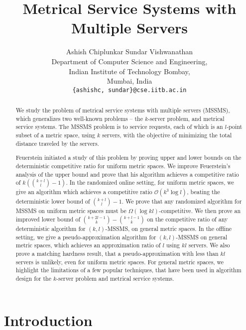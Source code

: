 \documentclass[11pt]{article}
\theoremstyle{plain}\newtheorem{theorem}{Theorem}
\theoremstyle{definition}
\theoremstyle{remark}
\begin{document}
\title{Metrical Service Systems with Multiple Servers}
\author{Ashish Chiplunkar \qquad Sundar Vishwanathan\\
Department of Computer Science and Engineering,\\
Indian Institute of Technology Bombay,\\
Mumbai, India\\
\texttt{\{ashishc, sundar\}@cse.iitb.ac.in}
}
\date{}
\maketitle

\begin{abstract}
We study the problem of metrical service systems with multiple servers (MSSMS), which generalizes two well-known problems -- the $k$-server problem, and metrical service systems. 
The MSSMS problem is to service requests, each of which is an $l$-point subset of a metric space, using $k$ servers, with the objective of minimizing the total distance traveled by the servers.


Feuerstein \cite{Feuerstein98} initiated a study of this problem by proving upper and lower bounds on the deterministic competitive ratio for uniform metric spaces. We improve Feuerstein's analysis of the upper bound and prove that his algorithm achieves a competitive ratio of $k\left({{k+l}\choose{l}}-1\right)$.
In the randomized online setting, for uniform metric spaces, we give an algorithm which achieves a competitive ratio $\mathcal{O}(k^3\log l)$, beating the deterministic lower bound of ${{k+l}\choose{l}}-1$.
We prove that any randomized algorithm for MSSMS on uniform metric spaces must be $\Omega(\log kl)$-competitive. We then prove an improved lower bound of ${{k+2l-1}\choose{k}}-{{k+l-1}\choose{k}}$ on the competitive ratio of any deterministic algorithm for $(k,l)$-MSSMS, on general metric spaces. In the offline setting, we give a pseudo-approximation algorithm for $(k,l)$-MSSMS on general metric spaces, which achieves an approximation ratio of $l$ using $kl$ servers. We also prove a matching hardness result, that a pseudo-approximation with less than $kl$ servers is unlikely, even for uniform metric spaces. For general metric spaces, we highlight the limitations of a few popular techniques, that have been used in algorithm design for the $k$-server problem and metrical service systems.
\end{abstract}

\section{Introduction}
\end{document}
